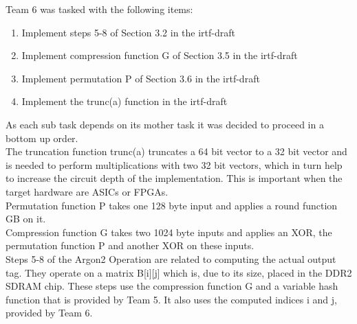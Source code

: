 Team 6 was tasked with the following items: 

\begin{enumerate}
\item Implement steps 5-8 of Section 3.2 in the irtf-draft \autocite{irtf-draft}
\item Implement compression function G of Section 3.5 in the irtf-draft \autocite{irtf-draft}
\item Implement permutation P of Section 3.6 in the irtf-draft \autocite{irtf-draft}
\item Implement the trunc(a) function in the irtf-draft \autocite{irtf-draft}
\end{enumerate}

As each sub task depends on its mother task it was decided to proceed in a bottom up
order. 
\\
The truncation function trunc(a) truncates a 64 bit vector to a 32 bit vector and 
is needed to perform multiplications with two 32 bit vectors, which in turn help to
increase the circuit depth of the implementation. This is important when the target
hardware are ASICs or FPGAs.
\\
Permutation function P takes one 128 byte input and applies a round function GB
on it.
\\
Compression function G takes two 1024 byte inputs and applies an XOR, the
permutation function P and another XOR on these inputs.
\\
Steps 5-8 of the Argon2 Operation are related to computing the actual output tag.
They operate on a matrix B[i][j] which is, due to its size, placed
in the DDR2 SDRAM chip. These steps use the compression function G and a variable 
hash function that is provided by Team 5. It also uses the computed indices i and j,
provided by Team 6.
